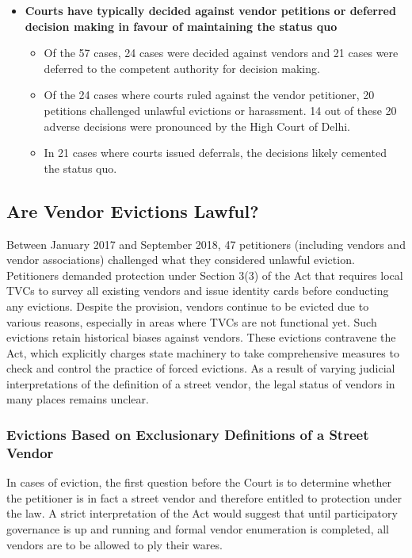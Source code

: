 \documentclass[a4paper, 12pt, twoside]{article}
\begin{document}
\begin{itemize}
\item \textbf{ Courts have typically decided against vendor petitions or deferred decision making in favour of maintaining the status quo} 

\begin{itemize}
\item 	Of the 57 cases, 24 cases were decided against vendors and 21 cases were deferred to the competent authority for decision making. 
\item 	Of the 24 cases where courts ruled against the vendor petitioner, 20 petitions challenged unlawful evictions or harassment. 14 out of these 20 adverse decisions were pronounced by the High Court of Delhi.
\item 	In 21 cases where courts issued deferrals, the decisions likely cemented the status quo.
\end{itemize}
\end{itemize}

\subsection{Are Vendor Evictions Lawful?}

Between January 2017 and September 2018, 47 petitioners (including vendors and vendor associations) challenged what they considered unlawful eviction. Petitioners demanded protection under Section 3(3) of the Act that requires local TVCs to survey all existing vendors and issue identity cards before conducting any evictions. Despite the provision, vendors continue to be evicted due to various reasons, especially in areas where TVCs are not functional yet. Such evictions retain historical biases against vendors. These evictions contravene the Act, which explicitly charges state machinery to take comprehensive measures to check and control the practice of forced evictions. As a result of varying judicial interpretations of the definition of a street vendor, the legal status of vendors in many places remains unclear.

\subsubsection{Evictions Based on Exclusionary Definitions of a Street Vendor}

In cases of eviction, the first question before the Court is to determine whether the petitioner is in fact a street vendor and therefore entitled to protection under the law. A strict interpretation of the Act would suggest that until participatory governance is up and running and formal vendor enumeration is completed, all vendors are to be allowed to ply their wares. 
\end{document}
